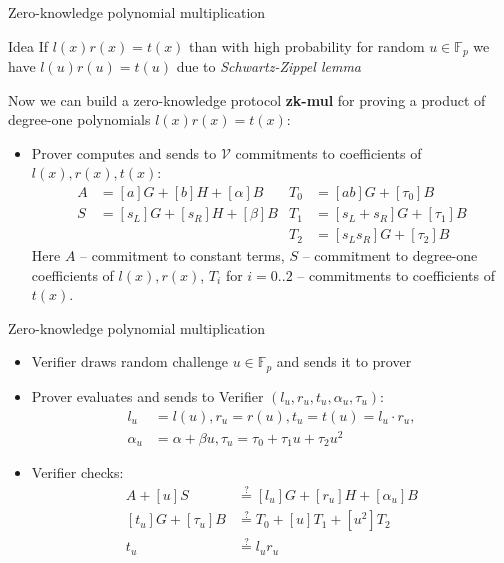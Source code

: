 \documentclass{zkdl-presentation-template}
\begin{document}
\begin{frame}{Zero-knowledge polynomial multiplication}
    \begin{block}{Idea}
        If $l(x)r(x) = t(x)$ than with high probability for random $u \in \mathbb{F}_p$ we have $l(u)r(u) = t(u)$ due to \textit{Schwartz-Zippel lemma}
    \end{block}
    Now we can build a zero-knowledge protocol \textbf{zk-mul} for proving a product of degree-one polynomials $l(x)r(x) = t(x)$:
    \begin{itemize}
        \item Prover computes and sends to $\mathcal{V}$ commitments to coefficients of $l(x), r(x), t(x)$:
            \begin{align*}
                A &= [a]G + [b]H + [\alpha]B & T_0 &= [ab]G + [\tau_0]B\\
                S &= [s_L]G + [s_R]H + [\beta]B &T_1 &= [s_L + s_R]G + [\tau_1]B\\
                &&T_2 &= [s_Ls_R]G + [\tau_2]B
            \end{align*}
        Here $A$ -- commitment to constant terms, $S$ -- commitment to degree-one coefficients of $l(x),r(x)$, $T_{i}$ for $i=0..2$ -- commitments to coefficients of $t(x)$.
    \end{itemize}
\end{frame}

\begin{frame}{Zero-knowledge polynomial multiplication}
    \begin{itemize}
        \item Verifier draws random challenge $u \in \mathbb{F}_p$ and sends it to prover
        \item Prover evaluates and sends to Verifier $(l_u, r_u, t_u, \alpha_u, \tau_u)$: 
        \begin{align*}
            l_u &=l(u), r_u = r(u), t_u = t(u) = l_u \cdot r_u, \\
            \alpha_u &= \alpha + \beta u, \tau_u = \tau_0 + \tau_1 u + \tau_2 u^2
        \end{align*}
        \item Verifier checks:
        \begin{align*}
            A + [u]S &\stackrel{?}{=} [l_u]G + [r_u]H + [\alpha_u]B \\
            [t_u]G + [\tau_u]B &\stackrel{?}{=} T_0 + [u]T_1 + [u^2]T_2 \\
            t_u &\stackrel{?}{=} l_u r_u
        \end{align*}
    \end{itemize}
\end{frame}
\end{document}
